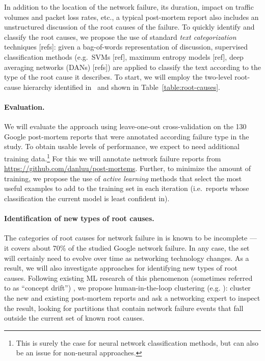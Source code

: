 In addition to the {\sc location} of the network failure, its {\sc
  duration}, {\sc impact on traffic volumes} and {\sc packet loss
  rates}, etc., a typical post-mortem report also includes an
unstructured {\sc discussion} of the root causes of the failure. To
quickly identify and classify the root causes, we propose the use of
standard {\it text categorization} techniques [refs]: given a
bag-of-words representation of {\sc discussion}, supervised
classification methods (e.g.\ SVMs [ref], maximum entropy models
[ref], deep averaging networks (DANs) [refs]) are applied to classify
the text according to the type of the root cause it describes.  To
start, we will employ the two-level root-cause hierarchy identified
in~\cite{rameshgoogle} and shown in
Table~\ref{table:root-causes}.

\paragraph{Evaluation.} We will evaluate the approach using leave-one-out cross-validation on
the 130 Google post-mortem reports that were annotated according
failure type in the \cite{rameshgoogle} study. To obtain usable
levels of performance, we expect to need additional training
data.\footnote{This is surely the case for neural network
  classification methods, but can also be an issue for non-neural
  approaches.}  For this we will annotate network failure reports from
\url{https://github.com/danluu/post-mortems}.  Further, to minimize
the amount of training, we propose the use of {\it active learning}
methods \cite{[refs]} that select the most useful examples to add to
the training set in each iteration (i.e.\ reports whose classification
the current model is least confident in).

\paragraph{Identification of new types of root causes.}  The categories of root causes for network
failure in \cite{rameshgoogle} is known to be incomplete --- it
covers about 70\% of the studied Google network failure.  In any case,
the set will certainly need to evolve over time as networking
technology changes.  As a result, we will also investigate approaches
for identifying new types of root causes.  Following existing ML
research of this phenomenon (sometimes referred to as ``concept
drift'') \cite{[refs]}, we propose human-in-the-loop clustering
(e.g. \cite{[refs]}): cluster the new and existing post-mortem reports
and ask a networking expert to inspect the result, looking for
partitions that contain network failure events that fall outside the
current set of known root causes.

